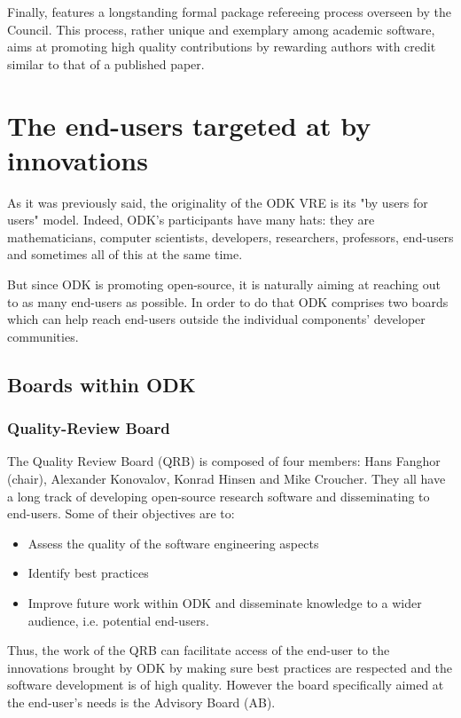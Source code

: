\documentclass{deliverablereport}
\begin{document}
Finally, \GAP features a longstanding formal package refereeing process
overseen by the \GAP Council. This process, rather unique and exemplary
among academic software, aims at promoting high quality contributions
by rewarding authors with credit similar to that of a published paper.

\section{The end-users targeted at by innovations}

As it was previously said, the originality of the ODK VRE is its "by users for
users" model. Indeed, ODK's participants have many hats: they are
mathematicians, computer scientists, developers, researchers, professors,
end-users and sometimes all of this at the same time.

But since ODK is promoting open-source, it is naturally aiming at reaching out
to as many end-users as possible. In order to do that ODK comprises two boards
which can help reach end-users outside the individual components' developer
communities.

\subsection{Boards within ODK}

\subsubsection{Quality-Review Board}

The Quality Review Board (QRB) is composed of four members: Hans
Fanghor (chair), Alexander Konovalov, Konrad Hinsen and Mike
Croucher. They all have a long track of developing open-source research
software and disseminating to end-users. Some of their objectives are
to:

\begin{itemize}
\item{Assess the quality of the software engineering aspects}
\item{Identify best practices}
\item{Improve future work within ODK and disseminate knowledge to a wider audience, i.e. potential end-users.}
\end{itemize}

Thus, the work of the QRB can facilitate access of the end-user to the
innovations brought by ODK by making sure best practices are
respected and the software development is of high quality. However the
board specifically aimed at the end-user's needs is the Advisory
Board (AB).
\end{document}
